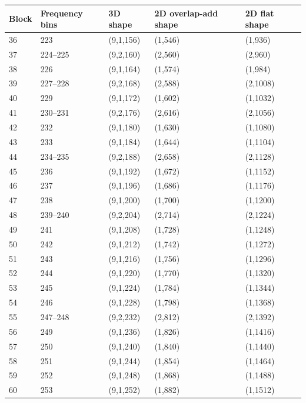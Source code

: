 \documentclass[report.tex]{subfiles}
\begin{document}
\begin{table}[ht]
	\centering
	\begin{tabular}{ |l|l|l|l|l| }
	 \hline
		Block & Frequency bins & 3D shape & 2D overlap-add shape & 2D flat shape \\
	 \hline
	 \hline
36 & 223 & (9,1,156) & (1,546) & (1,936) \\
\hline
37 & 224--225 & (9,2,160) & (2,560) & (2,960) \\
\hline
38 & 226 & (9,1,164) & (1,574) & (1,984) \\
\hline
39 & 227--228 & (9,2,168) & (2,588) & (2,1008) \\
\hline
40 & 229 & (9,1,172) & (1,602) & (1,1032) \\
\hline
41 & 230--231 & (9,2,176) & (2,616) & (2,1056) \\
\hline
42 & 232 & (9,1,180) & (1,630) & (1,1080) \\
\hline
43 & 233 & (9,1,184) & (1,644) & (1,1104) \\
\hline
44 & 234--235 & (9,2,188) & (2,658) & (2,1128) \\
\hline
45 & 236 & (9,1,192) & (1,672) & (1,1152) \\
\hline
46 & 237 & (9,1,196) & (1,686) & (1,1176) \\
\hline
47 & 238 & (9,1,200) & (1,700) & (1,1200) \\
\hline
48 & 239--240 & (9,2,204) & (2,714) & (2,1224) \\
\hline
49 & 241 & (9,1,208) & (1,728) & (1,1248) \\
\hline
50 & 242 & (9,1,212) & (1,742) & (1,1272) \\
\hline
51 & 243 & (9,1,216) & (1,756) & (1,1296) \\
\hline
52 & 244 & (9,1,220) & (1,770) & (1,1320) \\
\hline
53 & 245 & (9,1,224) & (1,784) & (1,1344) \\
\hline
54 & 246 & (9,1,228) & (1,798) & (1,1368) \\
\hline
55 & 247--248 & (9,2,232) & (2,812) & (2,1392) \\
\hline
56 & 249 & (9,1,236) & (1,826) & (1,1416) \\
\hline
57 & 250 & (9,1,240) & (1,840) & (1,1440) \\
\hline
58 & 251 & (9,1,244) & (1,854) & (1,1464) \\
\hline
59 & 252 & (9,1,248) & (1,868) & (1,1488) \\
\hline
60 & 253 & (9,1,252) & (1,882) & (1,1512) \\

\end{tabular}
\end{table}
\end{document}
